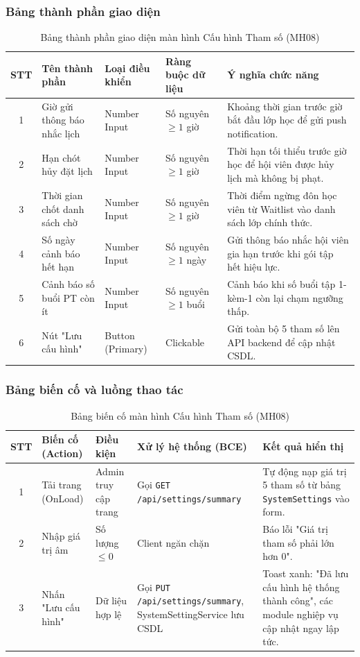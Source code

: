 \documentclass[12pt,a4paper]{report}
\begin{document}
\subsubsection{Bảng thành phần giao diện}
\begin{table}[H]
\centering
\small
\begin{tabularx}{\textwidth}{|c|l|l|l|X|}
\hline
\textbf{STT} & \textbf{Tên thành phần} & \textbf{Loại điều khiển} & \textbf{Ràng buộc dữ liệu} & \textbf{Ý nghĩa chức năng} \\ \hline
1 & Giờ gửi thông báo nhắc lịch & Number Input & Số nguyên $\ge 1$ giờ & Khoảng thời gian trước giờ bắt đầu lớp học để gửi push notification. \\ \hline
2 & Hạn chót hủy đặt lịch & Number Input & Số nguyên $\ge 1$ giờ & Thời hạn tối thiểu trước giờ học để hội viên được hủy lịch mà không bị phạt. \\ \hline
3 & Thời gian chốt danh sách chờ & Number Input & Số nguyên $\ge 1$ giờ & Thời điểm ngừng đôn học viên từ Waitlist vào danh sách lớp chính thức. \\ \hline
4 & Số ngày cảnh báo hết hạn & Number Input & Số nguyên $\ge 1$ ngày & Gửi thông báo nhắc hội viên gia hạn trước khi gói tập hết hiệu lực. \\ \hline
5 & Cảnh báo số buổi PT còn ít & Number Input & Số nguyên $\ge 1$ buổi & Cảnh báo khi số buổi tập 1-kèm-1 còn lại chạm ngưỡng thấp. \\ \hline
6 & Nút "Lưu cấu hình" & Button (Primary) & Clickable & Gửi toàn bộ 5 tham số lên API backend để cập nhật CSDL. \\ \hline
\end{tabularx}
\caption{Bảng thành phần giao diện màn hình Cấu hình Tham số (MH08)}
\end{table}

\subsubsection{Bảng biến cố và luồng thao tác}
\begin{table}[H]
\centering
\small
\begin{tabularx}{\textwidth}{|c|l|l|X|X|}
\hline
\textbf{STT} & \textbf{Biến cố (Action)} & \textbf{Điều kiện} & \textbf{Xử lý hệ thống (BCE)} & \textbf{Kết quả hiển thị} \\ \hline
1 & Tải trang (OnLoad) & Admin truy cập trang & Gọi \texttt{GET /api/settings/summary} & Tự động nạp giá trị 5 tham số từ bảng \texttt{SystemSettings} vào form. \\ \hline
2 & Nhập giá trị âm & Số lượng $\le 0$ & Client ngăn chặn & Báo lỗi "Giá trị tham số phải lớn hơn 0". \\ \hline
3 & Nhấn "Lưu cấu hình" & Dữ liệu hợp lệ & Gọi \texttt{PUT /api/settings/summary}, SystemSettingService lưu CSDL & Toast xanh: "Đã lưu cấu hình hệ thống thành công", các module nghiệp vụ cập nhật ngay lập tức. \\ \hline
\end{tabularx}
\caption{Bảng biến cố màn hình Cấu hình Tham số (MH08)}
\end{table}
\end{document}
